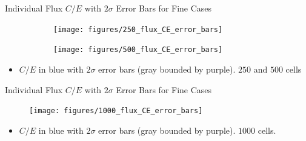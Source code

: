 \documentclass[9pt,t]{beamer}
\begin{document}
\begin{frame}{Individual Flux $C/E$ with $2\sigma$ Error Bars for Fine Cases}
    \begin{figure}[T]
        \hspace*{-1.1cm}
        \begin{subfigure}{0.495\textwidth}
            \texttt{[image: figures/250\_flux\_CE\_error\_bars]}
        \end{subfigure}\hspace*{0.89cm}
        \begin{subfigure}{0.495\textwidth}
            \texttt{[image: figures/500\_flux\_CE\_error\_bars]}
        \end{subfigure}
    \end{figure}
    \begin{itemize}
        \item $C/E$ in blue with $2\sigma$ error bars (gray bounded by purple). $250$ and $500$ cells
    \end{itemize}
\end{frame}

\begin{frame}{Individual Flux $C/E$ with $2\sigma$ Error Bars for Fine Cases}
    \begin{figure}[T]
        \centering
        \texttt{[image: figures/1000\_flux\_CE\_error\_bars]}
    \end{figure}
    \begin{itemize}
        \item $C/E$ in blue with $2\sigma$ error bars (gray bounded by purple). $1000$ cells.
    \end{itemize}
\end{frame}
\end{document}
